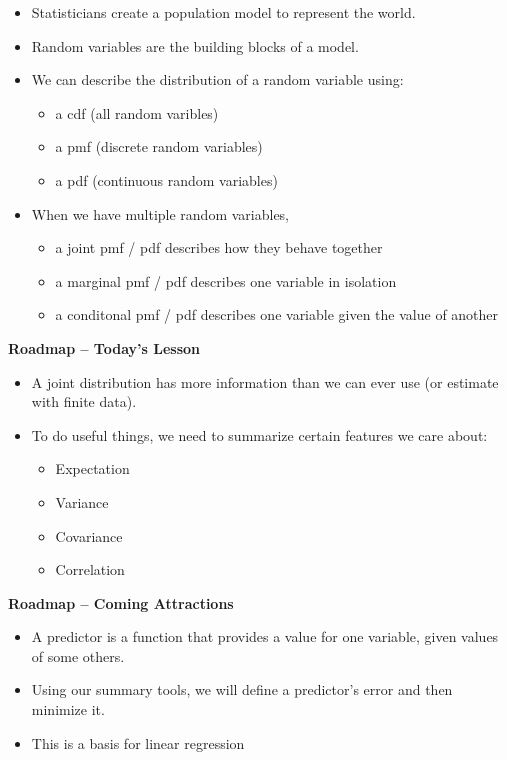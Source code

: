 \documentclass[
]{book}
\providecommand{\tightlist}{%
  \setlength{\itemsep}{0pt}\setlength{\parskip}{0pt}}
\theoremstyle{definition}
\theoremstyle{definition}
\theoremstyle{definition}
\theoremstyle{definition}
\theoremstyle{remark}
\begin{document}
\begin{itemize}
\tightlist
\item
  Statisticians create a population model to represent the world.
\item
  Random variables are the building blocks of a model.
\item
  We can describe the distribution of a random variable using:

  \begin{itemize}
  \tightlist
  \item
    a cdf (all random varibles)
  \item
    a pmf (discrete random variables)
  \item
    a pdf (continuous random variables)
  \end{itemize}
\item
  When we have multiple random variables,

  \begin{itemize}
  \tightlist
  \item
    a joint pmf / pdf describes how they behave together
  \item
    a marginal pmf / pdf describes one variable in isolation
  \item
    a conditonal pmf / pdf describes one variable given the value of another
  \end{itemize}
\end{itemize}

\textbf{Roadmap -- Today's Lesson}

\begin{itemize}
\tightlist
\item
  A joint distribution has more information than we can ever use (or estimate with finite data).
\item
  To do useful things, we need to summarize certain features we care about:

  \begin{itemize}
  \tightlist
  \item
    Expectation
  \item
    Variance
  \item
    Covariance
  \item
    Correlation
  \end{itemize}
\end{itemize}

\textbf{Roadmap -- Coming Attractions}

\begin{itemize}
\tightlist
\item
  A predictor is a function that provides a value for one variable, given values of some others.
\item
  Using our summary tools, we will define a predictor's error and then minimize it.
\item
  This is a basis for linear regression
\end{itemize}
\end{document}
